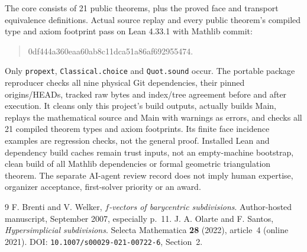 \documentclass[11pt]{article}
\begin{document}
The core consists of 21 public theorems, plus the proved face and
transport equivalence definitions. Actual source replay and every public
theorem's compiled type and axiom footprint pass on Lean 4.33.1 with Mathlib
commit:
\begin{quote}\small\ttfamily
0df444a360eaa60ab8c11dca51a86af692955474.
\end{quote}
Only \texttt{propext}, \texttt{Classical.choice} and \texttt{Quot.sound} occur.
The portable package reproducer checks all nine physical Git dependencies,
their pinned origins/HEADs, tracked raw bytes and index/tree agreement before
and after execution. It cleans only this project's build outputs, actually
builds Main, replays the mathematical source and Main with warnings as errors,
and checks all 21 compiled theorem types and axiom footprints. Its finite face
incidence examples are regression checks, not the general proof. Installed Lean
and dependency build caches remain trust inputs, not an empty-machine bootstrap,
clean build of all Mathlib dependencies or formal geometric triangulation
theorem. The separate AI-agent review record does not imply human expertise,
organizer acceptance, first-solver priority or an award.

\begin{thebibliography}{9}
 F. Brenti and V. Welker, \emph{$f$-vectors of barycentric subdivisions}.
  Author-hosted manuscript, September 2007, especially p.~11.
 J. A. Olarte and F. Santos, \emph{Hypersimplicial subdivisions}.
  Selecta Mathematica \textbf{28} (2022), article~4 (online 2021).
  DOI: \texttt{10.1007/s00029-021-00722-6}, Section~2.
\end{thebibliography}
\end{document}
